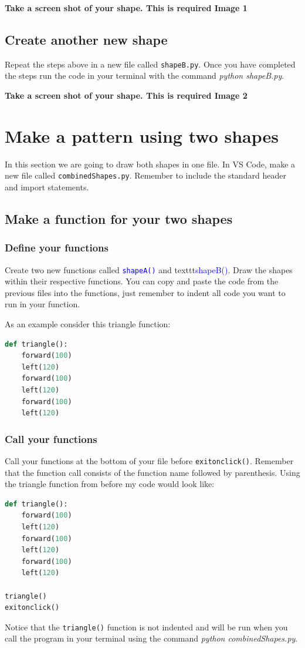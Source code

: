 \documentclass[12pt]{article}
\begin{document}
\textbf{Take a screen shot of your shape. This is required Image 1}

\subsection{ Create another new shape}
Repeat the steps above in a new file called \texttt{shapeB.py}.
Once you have completed the steps run the code in your terminal with the command \textit{python shapeB.py}.

\textbf{Take a screen shot of your shape. This is required Image 2}

\section{Make a pattern using two shapes}
In this section we are going to draw both shapes in one file.
In VS Code, make a new file called \texttt{combinedShapes.py}.
Remember to include the standard header and import statements. 

\subsection{Make a function for your two shapes}
\subsubsection{Define your functions}
Create two new functions called \texttt{\textcolor{blue}{shapeA()}} and texttt{\textcolor{blue}{shapeB()}}.
Draw the shapes within their respective functions.
You can copy and paste the code from the previous files into the functions, just remember to indent all code you want to run in your function.

As an example consider this triangle function:
\begin{lstlisting}[language=Python]
def triangle():
    forward(100)
    left(120)
    forward(100)
    left(120)
    forward(100)
    left(120)\end{lstlisting}

\subsubsection{Call your functions}
Call your functions at the bottom of your file before \texttt{exitonclick()}.
Remember that the function call consists of the function name followed by parenthesis.
Using the triangle function from before my code would look like:
\begin{lstlisting}[language=Python]
def triangle():
    forward(100)
    left(120)
    forward(100)
    left(120)
    forward(100)
    left(120)

triangle()
exitonclick()
\end{lstlisting}
Notice that the \texttt{triangle()} function is not indented and will be run when you call the program in your terminal using the command \textit{python combinedShapes.py}.
\end{document}
